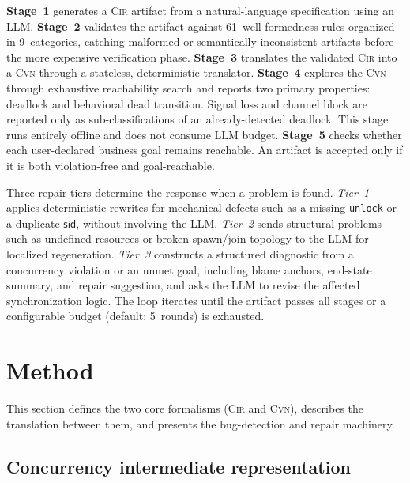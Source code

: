 \documentclass{article}
\begin{document}

\textbf{Stage~1} generates a \textsc{Cir} artifact from a natural-language specification using an LLM.
\textbf{Stage~2} validates the artifact against 61~well-formedness rules organized in 9~categories, catching malformed or semantically inconsistent artifacts before the more expensive verification phase.
\textbf{Stage~3} translates the validated \textsc{Cir} into a \textsc{Cvn} through a stateless, deterministic translator. 
\textbf{Stage~4} explores the \textsc{Cvn} through exhaustive reachability search and reports two primary properties: deadlock and behavioral dead transition.  Signal loss and channel block are reported only as sub-classifications of an already-detected deadlock. This stage runs entirely offline and does not consume LLM budget.
\textbf{Stage~5} checks whether each user-declared business goal remains reachable.  An artifact is accepted only if it is both violation-free and goal-reachable.

Three repair tiers determine the response when a problem is found. \emph{Tier~1} applies deterministic rewrites for mechanical defects such as a missing \texttt{unlock} or a duplicate $\mathsf{sid}$, without involving the LLM. \emph{Tier~2} sends structural problems such as undefined resources or broken spawn/join topology to the LLM for localized regeneration. \emph{Tier~3} constructs a structured diagnostic from a concurrency violation or an unmet goal, including blame anchors, end-state summary, and repair suggestion, and asks the LLM to revise the affected synchronization logic. The loop iterates until the artifact passes all stages or a configurable budget (default: 5~rounds) is exhausted.


\section{Method}
\label{sec:method}

This section defines the two core formalisms (\textsc{Cir} and \textsc{Cvn}), describes the translation between them, and presents the bug-detection and repair machinery.

\subsection{Concurrency intermediate representation}
\label{subsec:cir-def}
\end{document}
